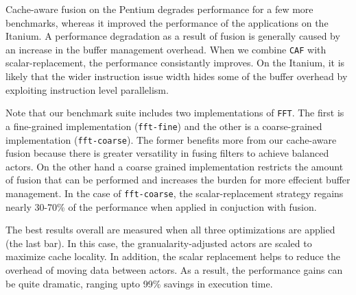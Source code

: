 Cache-aware fusion on the Pentium degrades performance for a few more benchmarks,
whereas it improved the performance of the applications on the Itanium.
A performance degradation as a result of fusion is generally caused by
an increase in the buffer management overhead. When
we combine \texttt{CAF} with scalar-replacement, the
performance consistantly improves. On the Itanium, it is likely that
the wider instruction issue width hides some of the buffer overhead by
exploiting instruction level parallelism.

Note that our benchmark suite
includes two implementations of \texttt{FFT}. The first is a
fine-grained implementation (\texttt{fft-fine}) and the other is a
coarse-grained implementation (\texttt{fft-coarse}). The former
benefits more from our cache-aware fusion because there is greater
versatility in fusing filters to achieve balanced actors. On the other hand
a coarse grained implementation restricts the amount of fusion that
can be performed and increases the burden for more effecient buffer
management. In the case of \texttt{fft-coarse}, the scalar-replacement
strategy regains nearly 30-70\% of the performance when applied in
conjuction with fusion.

The best results overall are measured when all three optimizations are
applied (the last bar). In this case, the granualarity-adjusted actors
are scaled to maximize cache locality. In addition, the scalar replacement
helps to reduce the overhead of moving data
between actors. As a result, the performance gains can be quite
dramatic, ranging upto 99\% savings in execution time.

